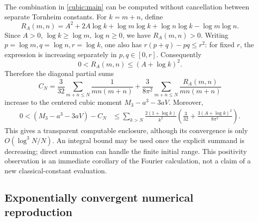 The combination in \eqref{cubic:main} can be computed without cancellation
between separate Tornheim constants.  For $k=m+n$, define
\[
 R_A(m,n)=A^2+2A\log k+\log m\log k+\log n\log k-\log m\log n.
\]
Since $A>0$, $\log k\ge\log m,\log n\ge0$, we have $R_A(m,n)>0$.
Writing $p=\log m,q=\log n,r=\log k$, one also has
$r(p+q)-pq\le r^2$: for fixed $r$, the expression is increasing separately
in $p,q\in[0,r]$.  Consequently
\[
 0<R_A(m,n)\le(A+\log k)^2.
\]
Therefore the diagonal partial sums
\[
 C_N=\frac3{32}\sum_{m+n\le N}\frac1{mn(m+n)}
    +\frac{3}{8\pi^2}
       \sum_{m+n\le N}\frac{R_A(m,n)}{mn(m+n)}
\]
increase to the centered cubic moment $M_3-a^3-3aV$.  Moreover,
\begin{align*}
 0<(M_3-a^3-3aV)-C_N
 &\le\sum_{k>N}\frac{2(1+\log k)}{k^2}
       \left(\frac3{32}+\frac{3(A+\log k)^2}{8\pi^2}\right).
\end{align*}
This gives a transparent computable enclosure, although its convergence
is only $O(\log^3N/N)$.  An integral bound may be used once the explicit
summand is decreasing; direct summation can handle the finite initial range.
This positivity observation is an immediate corollary of the Fourier
calculation, not a claim of a new classical-constant evaluation.

\subsection{Exponentially convergent numerical reproduction}

